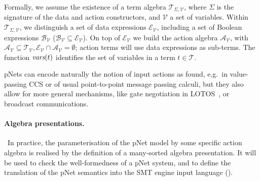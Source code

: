 \documentclass[smallcondensed]{svjour3}
\newcommand{\cT}{\ensuremath{\mathcal{T}}}
\newcommand{\cV}{\ensuremath{\mathcal{V}}}
\newcommand{\signature}{\ensuremath{\Sigma}}
\newcommand{\variables}{\ensuremath{\cV}}
\newcommand{\Talg}{\ensuremath{\cT_{\signature,\variables}}}
\def\AlgT{\mathcal{T}}
\newcommand{\eg}[1][\ ]{e.g.#1}
\begin{document}
\renewcommand{\P}{\mathcal V}
\def\Talg{\mathcal{T}_{\Sigma,\P}}
Formally, we assume the existence of a term algebra $\Talg$,
where $\Sigma$ is the signature of the data and action constructors,
and $\P$ a set of variables. Within $\Talg$, we distinguish a set of
data expressions $\mathcal{E}_\P$, including a set of Boolean
expressions $\mathcal{B}_{\P}$ ($\mathcal{B}_{\P}\subseteq\mathcal{E}_\P$).
On top of $\mathcal{E}_\P$ we build the action algebra
$\mathcal{A}_\P$, with $\mathcal{A}_\P\subseteq\mathcal{T}_\P,
\mathcal{E}_\P\cap\mathcal{A}_\P=\emptyset$;
 action terms will use data expressions as sub-terms.
The function $\vars(t)$ identifies the set of variables in a term
$t\in\AlgT$.

pNets can encode naturally the notion of input actions as found,
\eg in value-passing CCS 
\cite{Milner89} or of usual point-to-point message passing calculi,
but they also allow 
for more general mechanisms, like gate negotiation in LOTOS~\cite{LotosISO89}, or broadcast
communications.

\paragraph*{Algebra presentations.}\
In practice, the parameterisation of the pNet model by some specific
action algebra is realised by the definition of a many-sorted algebra
presentation. It will be used to check the
well-formedness of a pNet system, and to define the translation of the pNet
semantics into the SMT engine input language (\cite{BarFT-RR-17}).
\end{document}
